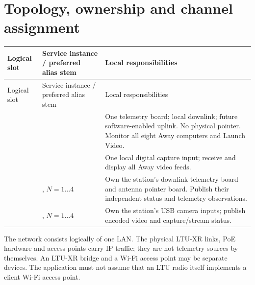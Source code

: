 \section{Topology, ownership and channel assignment}


\begin{longtable}{L{31mm}L{45mm}L{85mm}}
\toprule Logical slot & Service instance / preferred alias stem & Local responsibilities\\\midrule
\endfirsthead
\toprule Logical slot & Service instance / preferred alias stem & Local responsibilities\\\midrule
\endhead
{} &  & One telemetry board; local downlink; future software-enabled uplink. No physical pointer. Monitor all eight Away computers and Launch Video.\\
 &  & One local digital capture input; receive and display all Away video feeds.\\
 & , $N=1\ldots4$ & Own the station's downlink telemetry board and antenna pointer board. Publish their independent status and telemetry observations.\\
 & , $N=1\ldots4$ & Own the station's USB camera inputs; publish encoded video and capture/stream status.\\
\bottomrule
\end{longtable}


The network consists logically of one LAN. The physical LTU-XR links, PoE hardware
and access points carry IP traffic; they are not telemetry sources by themselves.
An LTU-XR bridge and a Wi-Fi access point may be separate devices. The application
must not assume that an LTU radio itself implements a client Wi-Fi access point.

